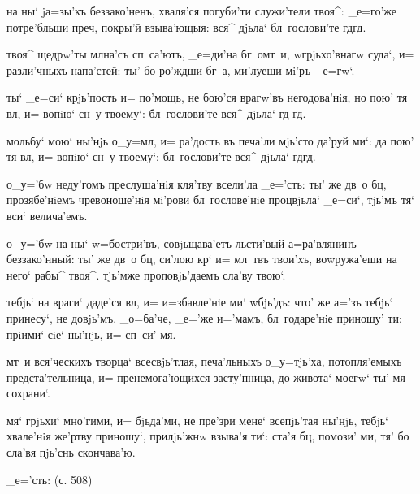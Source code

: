  на ны` jа=зы'къ беззако'ненъ, хваля'ся 
погуби'ти служи'тели твоя^: _е=го'же потре'бльши 
преч, покры'й взыва'ющыя: вся^ дjьла` бл~гослови'те 
гд гд.

 твоя^ щедрw'ты мл на'съ сп~са'ютъ, 
_е=ди'на бг~омт~и, w\т грjьхо'внагw суда`, и= разли'чныхъ 
напа'стей: ты' бо ро'ждши бг~а, ми'луеши мi'ръ _е=гw`.

  ты` _е=си` крjь'пость и= по'мощь, 
не бою'ся врагw'въ негодова'нiя, но пою' тя вл, и= 
вопiю` сн~у твоему`: бл~гослови'те вся^ дjьла` гд 
гд.

   мольбу` мою` ны'нjь о_у=мл, 
и= ра'дость въ печа'ли мjь'сто да'руй ми`: да пою' тя 
вл, и= вопiю` сн~у твоему`: бл~гослови'те вся^ 
дjьла` гд гд.


  о_у='бw неду'гомъ преслуша'нiя 
кля'тву всели'ла _е='сть: ты' же дв~о бц, 
прозябе'нiемъ чревоноше'нiя мi'рови бл~гослове'нiе 
процвjьла` _е=си`, тjь'мъ тя` вси` велича'емъ.

 о_у='бw на ны` w=бостри'въ, 
совjьщава'етъ льсти'вый а=ра'влянинъ беззако'нный: ты' же 
дв~о бц, си'лою кр` и= мл~твъ твои'хъ, воwружа'еши 
на него` рабы^ твоя^. тjь'мже проповjь'даемъ сла'ву 
твою`.

 тебjь` на враги` даде'ся вл, и= 
и=збавле'нiе ми` w\т бjь'дъ: что' же а='зъ тебjь` 
принесу`, не довjь'мъ. _о=ба'че, _е='же и='мамъ, 
бл~годаре'нiе приношу' ти: прiими` сiе` ны'нjь, и= сп~си' 
мя.

 мт~и вся'ческихъ творца` всесвjь'тлая, 
печа'льныхъ о_у=тjь'ха, потопля'емыхъ предста'тельница, 
и= пренемога'ющихся засту'пница, до живота` моегw` ты' мя 
сохрани`.

   мя` грjьхи` мно'гими, и= 
бjьда'ми, не пре'зри мене` всепjь'тая ны'нjь, тебjь` 
хвале'нiя же'ртву приношу`, прилjь'жнw взыва'я ти`: ста'я 
бц, помози' ми, тя' бо сла'вя пjь'снь скончава'ю.

  _е='сть:  (с. 508)
